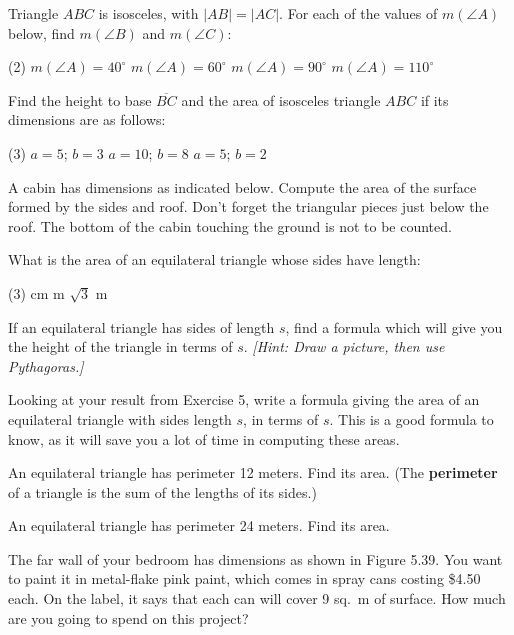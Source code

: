 \documentclass[12pt]{book} %
\begin{document}
\setcounter{Exercise}{0}
\begin{ExerciseList}
\Exercise Triangle $ABC$ is isosceles, with $|AB|=|AC|$. For each of the values of $m(\angle A)$ below, find $m(\angle B)$ and $m(\angle C)$:
\begin{tasks}(2)
\task[(a)] $m(\angle A)=40^\circ$
\task[(b)] $m(\angle A)=60^\circ$
\task[(c)] $m(\angle A)=90^\circ$
\task[(d)] $m(\angle A)=110^\circ$
\end{tasks}


\Exercise Find the height to base $\overline{BC}$ and the area of isosceles triangle $ABC$ if its dimensions are as follows:
\begin{tasks}(3)
\task[(a)] $a=5$; $b=3$
\task[(b)] $a=10$; $b=8$
\task[(c)] $a=5$; $b=2$
\end{tasks}


\Exercise A cabin has dimensions as indicated below. Compute the area of the surface formed by the sides and roof. Don't forget the triangular pieces just below the roof. The bottom of the cabin touching the ground is not to be counted.


\Exercise What is the area of an equilateral triangle whose sides have length:
\begin{tasks}(3)
 cm
 m
\task[(c)] $\sqrt{3}$ m
\end{tasks}

\Exercise If an equilateral triangle has sides of length $s$, find a formula which will give you the height of the triangle in terms of $s$. \textit{[Hint: Draw a picture, then use Pythagoras.]}

\Exercise Looking at your result from Exercise 5, write a formula giving the area of an equilateral triangle with sides length $s$, in terms of $s$. This is a good formula to know, as it will save you a lot of time in computing these areas.

\Exercise An equilateral triangle has perimeter 12 meters. Find its area. (The \textbf{perimeter} of a triangle is the sum of the lengths of its sides.)

\Exercise An equilateral triangle has perimeter 24 meters. Find its area.

\Exercise The far wall of your bedroom has dimensions as shown in Figure 5.39. You want to paint it in metal-flake pink paint, which comes in spray cans costing \$4.50 each. On the label, it says that each can will cover 9 sq.\ m of surface. How much are you going to spend on this project?


\end{ExerciseList}
\end{document}
